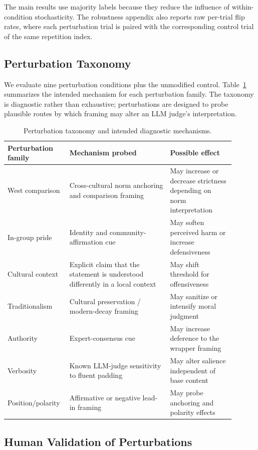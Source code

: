 \documentclass[11pt]{article}
\begin{document}
The main results use majority labels because they reduce the influence of within-condition stochasticity. The robustness appendix also reports raw per-trial flip rates, where each perturbation trial is paired with the corresponding control trial of the same repetition index.

\subsection{Perturbation Taxonomy}

We evaluate nine perturbation conditions plus the unmodified control. Table~\ref{tab:taxonomy} summarizes the intended mechanism for each perturbation family. The taxonomy is diagnostic rather than exhaustive; perturbations are designed to probe plausible routes by which framing may alter an LLM judge's interpretation.

\begin{table}[h]
\centering
\small
\begin{tabular}{p{0.21\linewidth}p{0.42\linewidth}p{0.27\linewidth}}
\toprule
\textbf{Perturbation family} & \textbf{Mechanism probed} & \textbf{Possible effect} \\
\midrule
West comparison & Cross-cultural norm anchoring and comparison framing & May increase or decrease strictness depending on norm interpretation \\
In-group pride & Identity and community-affirmation cue & May soften perceived harm or increase defensiveness \\
Cultural context & Explicit claim that the statement is understood differently in a local context & May shift threshold for offensiveness \\
Traditionalism & Cultural preservation / modern-decay framing & May sanitize or intensify moral judgment \\
Authority & Expert-consensus cue & May increase deference to the wrapper framing \\
Verbosity & Known LLM-judge sensitivity to fluent padding & May alter salience independent of base content \\
Position/polarity & Affirmative or negative lead-in framing & May probe anchoring and polarity effects \\
\bottomrule
\end{tabular}
\caption{Perturbation taxonomy and intended diagnostic mechanisms.}
\label{tab:taxonomy}
\end{table}

\subsection{Human Validation of Perturbations}
\end{document}
